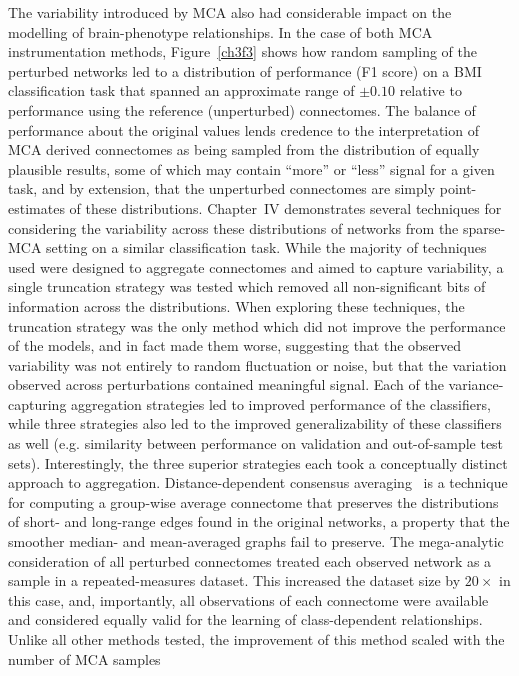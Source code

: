 The variability introduced by MCA also had considerable impact on the modelling of brain-phenotype relationships.
In the case of both MCA instrumentation methods, Figure~\ref{ch3f3} shows how random sampling of the perturbed
networks led to a distribution of performance (F1 score) on a BMI classification task that spanned an approximate
range of $\pm 0.10$ relative to performance using the reference (unperturbed) connectomes. The balance of
performance about the original values lends credence to the interpretation of MCA derived connectomes as being
sampled from the distribution of equally plausible results, some of which may contain ``more'' or ``less'' signal
for a given task, and by extension, that the unperturbed connectomes are simply point-estimates of these
distributions. Chapter~IV demonstrates several techniques for considering the variability across these
distributions of networks from the sparse-MCA setting on a similar classification task. While the majority of
techniques used were designed to aggregate connectomes and aimed to capture variability, a single truncation
strategy was tested which removed all non-significant bits of information across the distributions. When exploring
these techniques, the truncation strategy was the only method which did not improve the performance of the models,
and in fact made them worse, suggesting that the observed variability was not entirely to random fluctuation or
noise, but that the variation observed across perturbations contained meaningful signal. Each of the
variance-capturing aggregation strategies led to improved performance of the classifiers, while three strategies
also led to the improved generalizability of these classifiers as well (e.g. similarity between performance on
validation and out-of-sample test sets). Interestingly, the three superior strategies each took a conceptually
distinct approach to aggregation. Distance-dependent consensus averaging~\cite{Betzel2018-eo} is a technique for
computing a group-wise average connectome that preserves the distributions of short- and long-range edges found in
the original networks, a property that the smoother median- and mean-averaged graphs fail to preserve. The
mega-analytic consideration of all perturbed connectomes treated each observed network as a sample in a
repeated-measures dataset. This increased the dataset size by $20 \times$ in this case, and, importantly, all
observations of each connectome were available and considered equally valid for the learning of class-dependent
relationships. Unlike all other methods tested, the improvement of this method scaled with the number of MCA samples
